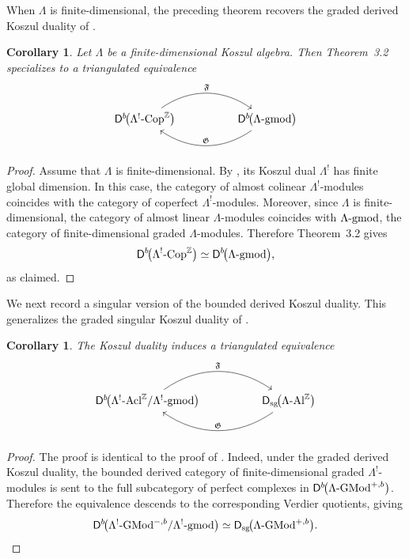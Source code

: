 \documentclass[11pt]{article}
\newtheorem{corollary}[theorem]{Corollary}
\theoremstyle{definition}
\theoremstyle{remark}
\begin{document}
When \(\Lambda\) is finite-dimensional, the preceding theorem recovers the
graded derived Koszul duality of \cite[Theorem~3.8]{8}.

\begin{corollary}
Let \(\Lambda\) be a finite-dimensional Koszul algebra. Then Theorem~3.2
specializes to a triangulated equivalence
\[
\begin{tikzcd}[column sep=huge]
\mathsf{D}^{b}\!\bigl(\Lambda^{!}\textup{-Cop}^{\mathbb{Z}}\bigr)
\arrow[r, bend left=35, "\mathfrak{F}"]
&
\mathsf{D}^{b}\!\bigl(\Lambda\textup{-gmod}\bigr)
\arrow[l, bend left=35, "\mathfrak{G}"']
\end{tikzcd}
\]
\end{corollary}

\begin{proof}
Assume that \(\Lambda\) is finite-dimensional. By
\cite[Theorem~2.6]{8}, its Koszul dual \(\Lambda^{!}\) has finite global
dimension. In this case, the category of almost colinear
\(\Lambda^{!}\)-modules coincides with the category of coperfect
\(\Lambda^{!}\)-modules. Moreover, since \(\Lambda\) is finite-dimensional,
the category of almost linear \(\Lambda\)-modules coincides with
\(\Lambda\textup{-gmod}\), the category of finite-dimensional graded
\(\Lambda\)-modules. Therefore Theorem~3.2 gives
\[
\mathsf{D}^{b}\!\bigl(\Lambda^{!}\textup{-Cop}^{\mathbb{Z}}\bigr)
\simeq
\mathsf{D}^{b}\!\bigl(\Lambda\textup{-gmod}\bigr),
\]
as claimed.
\end{proof}
We next record a singular version of the bounded derived Koszul duality. This
generalizes the graded singular Koszul duality of
\cite[Theorem~3.16]{8}.

\begin{corollary}
The Koszul duality induces a triangulated equivalence
\[
\begin{tikzcd}[column sep=huge]
\mathsf{D}^{b}\!\bigl(
\Lambda^{!}\textup{-Acl}^{\mathbb Z}
/\Lambda^{!}\textup{-}\mathrm{gmod}
\bigr)
\arrow[r, bend left=35, "\mathfrak{F}"]
&
\mathsf{D}_{\mathrm{sg}}\!\bigl(
\Lambda\textup{-Al}^{\mathbb Z}
\bigr)
\arrow[l, bend left=35, "\mathfrak{G}"']
\end{tikzcd}
\]
\end{corollary}

\begin{proof}
The proof is identical to the proof of \cite[Theorem~3.16]{8}. Indeed, under
the graded derived Koszul duality, the bounded derived category of
finite-dimensional graded \(\Lambda^{!}\)-modules is sent to the full
subcategory of perfect complexes in
\(\mathsf{D}^{b}\!\bigl(\Lambda\textup{-}\mathrm{GMod}^{+,b}\bigr)\).
Therefore the equivalence descends to the corresponding Verdier quotients,
giving
\[
\mathsf{D}^{b}\!\bigl(
\Lambda^{!}\textup{-}\mathrm{GMod}^{-,b}
/\Lambda^{!}\textup{-}\mathrm{gmod}
\bigr)
\simeq
\mathsf{D}_{\mathrm{sg}}\!\bigl(
\Lambda\textup{-}\mathrm{GMod}^{+,b}
\bigr).
\]
\end{proof}
\end{document}
